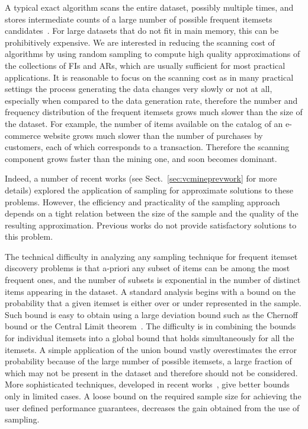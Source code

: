 A typical exact algorithm scans the entire dataset,
possibly multiple times, and stores intermediate counts of a large number of
possible frequent itemsets candidates~\citep{AgrawalS94,HanPY00}. For large
datasets that do not fit in main memory, this can be prohibitively expensive. We
are interested in reducing the scanning cost of algorithms by using random
sampling to compute high quality approximations of the collections of FIs and
ARs, which are usually sufficient for most practical applications. It is
reasonable to focus on the scanning cost as in many practical settings
the process generating the data changes very slowly or not at all, especially
when compared to the data generation rate, therefore the number and frequency
distribution of the frequent itemsets grows much slower than the size of the
dataset. For example, the number of items available on the catalog of an
e-commerce website grows much slower than the number of purchases by customers,
each of which corresponds to a transaction.  Therefore the scanning component
grows faster than the mining one, and soon becomes dominant. 

Indeed, a number of recent works (see
Sect.~\ref{sec:vcmineprevwork} for more details)
explored the application of sampling for approximate solutions to these
problems. However, the efficiency and practicality of the sampling approach
depends on a tight relation between the size of the sample and the quality of
the resulting approximation. Previous works do not provide satisfactory
solutions to this problem.

The technical difficulty in analyzing any sampling technique for frequent
itemset discovery problems is that a-priori any subset of items can be among
the most frequent ones, and the number of subsets is exponential in the number
of distinct items appearing in the dataset. A standard analysis begins with a bound on
the probability that a given itemset is either over or under represented in the
sample. Such bound is easy to obtain using a large deviation bound such as the
Chernoff bound or the Central Limit theorem~\citep{MitzenmacherU05}. The
difficulty is in combining the bounds for individual itemsets
into a global bound that holds simultaneously for all the itemsets. A simple
application of the union bound vastly overestimates the error probability
because of the large number of possible itemsets, a large fraction of which may
not be present in the dataset and therefore should not be considered. More
sophisticated techniques, developed in recent
works~\citep{ChakaravarthyPS09,PietracaprinaRUV10,ChuangCY05}, give better
bounds only in limited cases. A loose bound 
 on the required sample size for achieving the user defined
 performance guarantees, decreases the gain obtained from the use of sampling. 


